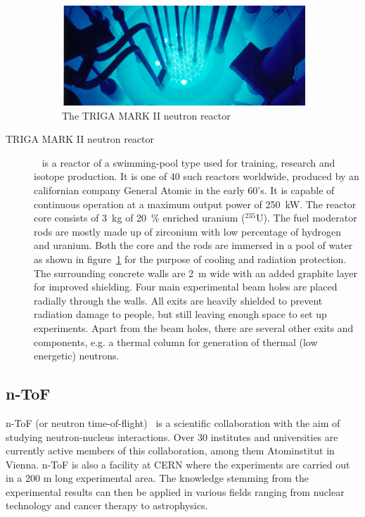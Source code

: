 \begin{description}
\begin{figure}[!t]
\centering
\includegraphics[width=0.9\textwidth]{01_introduction/pics/triga}
\caption{The TRIGA MARK II neutron reactor \cite{GeneralAtomics}}
\label{fig:triga}
\end{figure}
\item[TRIGA MARK II neutron reactor]~\cite{Triga:00000} is a reactor of a swimming-pool type used for training, research and isotope production. It is one of 40 such reactors worldwide, produced by an californian company General Atomic in the early 60's. It is capable of continuous operation at a maximum output power of 250~kW. 
The reactor core consists of 3~kg of 20~\% enriched uranium ($^{235}$U). The fuel moderator rods are mostly made up of zirconium with low percentage of hydrogen and uranium. Both the core and the rods are immersed in a pool of water as shown in figure~\ref{fig:triga} for the purpose of cooling and radiation protection. The surrounding concrete walls are 2~m wide with an added graphite layer for improved shielding. Four main experimental beam holes are placed radially through the walls. All exits are heavily shielded to prevent radiation damage to people, but still leaving enough space to set up experiments. Apart from the beam holes, there are several other exits and components, e.g. a thermal column for generation of thermal (low energetic) neutrons.


\end{description}




\subsection{n-ToF}
n-ToF (or neutron time-of-flight)~\cite{NTOF:00000} is a scientific collaboration with the aim of studying neutron-nucleus interactions. Over 30 institutes and universities are currently active members of this collaboration, among them Atominstitut in Vienna. n-ToF is also a facility at CERN where the experiments are carried out in a 200 m long experimental area. The knowledge stemming from the experimental results can then be applied in various fields ranging from nuclear technology and cancer therapy to astrophysics.

